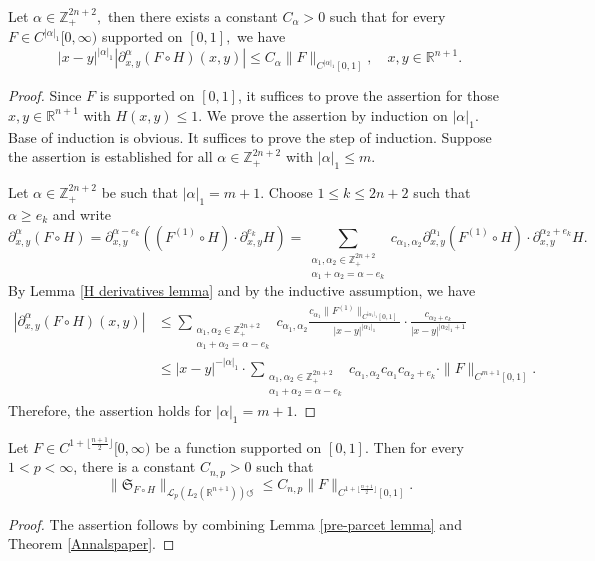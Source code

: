 \documentclass[12pt]{amsart}
\begin{document}
\begin{lemma}\label{pre-parcet lemma} Let $\alpha\in\mathbb{Z}^{2n+2}_+,$ then there exists a constant $C_\alpha>0$ such that for every $F\in C^{|\alpha|_1}[0,\infty)$ supported on $[0,1],$ we have
$$|x-y|^{|\alpha|_1}|\partial_{x,y}^{\alpha}(F\circ H)(x,y)|\leq C_{\alpha}\|F\|_{C^{|\alpha|_1}[0,1]},\quad x,y\in\mathbb{R}^{n+1}.$$
\end{lemma}
\begin{proof}
Since $F$ is supported on $[0,1]$, it suffices to prove the assertion for those $x,y\in\mathbb{R}^{n+1}$ with $H(x,y)\leq 1.$ We prove the assertion by induction on $|\alpha|_1.$ Base of induction is obvious. It suffices to prove the step of induction. Suppose the assertion is established for all $\alpha\in\mathbb{Z}^{2n+2}_+$ with $|\alpha|_1\leq m.$
	
Let $\alpha\in\mathbb{Z}^{2n+2}_+$ be such that $|\alpha|_1=m+1.$ Choose $1\leq k\leq 2n+2$ such that $\alpha\geq e_k$ and write
$$\partial_{x,y}^{\alpha}(F\circ H)=\partial_{x,y}^{\alpha-e_k}((F^{(1)}\circ H)\cdot \partial_{x,y}^{e_k}H)=\sum_{\substack{\alpha_1,\alpha_2\in\mathbb{Z}^{2n+2}_+\\ \alpha_1+\alpha_2=\alpha-e_k}}c_{\alpha_1,\alpha_2}\partial_{x,y}^{\alpha_1}(F^{(1)}\circ H)\cdot \partial_{x,y}^{\alpha_2+e_k}H.$$
By Lemma \ref{H derivatives lemma} and by the inductive assumption, we have
\begin{align*}
|\partial_{x,y}^{\alpha}(F\circ H)(x,y)|&\leq\sum_{\substack{\alpha_1,\alpha_2\in\mathbb{Z}^{2n+2}_+\\ \alpha_1+\alpha_2=\alpha-e_k}}c_{\alpha_1,\alpha_2}\frac{c_{\alpha_1}\|F^{(1)}\|_{C^{|\alpha_1|_1}[0,1]}}{|x-y|^{|\alpha_1|_1}}\cdot \frac{c_{\alpha_2+e_k}}{|x-y|^{|\alpha_2|_1+1}}\\
&\leq |x-y|^{-|\alpha|_1}\cdot \sum_{\substack{\alpha_1,\alpha_2\in\mathbb{Z}^{2n+2}_+\\ \alpha_1+\alpha_2=\alpha-e_k}}c_{\alpha_1,\alpha_2}c_{\alpha_1}c_{\alpha_2+e_k}\cdot \|F\|_{C^{m+1}[0,1]}.
\end{align*}
Therefore, the assertion holds for $|\alpha|_1=m+1$.
\end{proof}

\begin{lemma}\label{post-parcet lemma} Let $F\in C^{1+\lfloor\frac{n+1}{2}\rfloor}[0,\infty)$ be a function supported on $[0,1].$ Then for every $1<p<\infty$, there is a constant $C_{n,p}>0$ such that
$$\|\mathfrak{S}_{F\circ H}\|_{\mathcal{L}_p(L_2(\mathbb{R}^{n+1}))\circlearrowleft}\leq C_{n,p}\|F\|_{C^{1+\lfloor\frac{n+1}{2}\rfloor}[0,1]}.$$
\end{lemma}
\begin{proof} The assertion follows by combining Lemma \ref{pre-parcet lemma} and Theorem \ref{Annalspaper}.
\end{proof}
\end{document}
